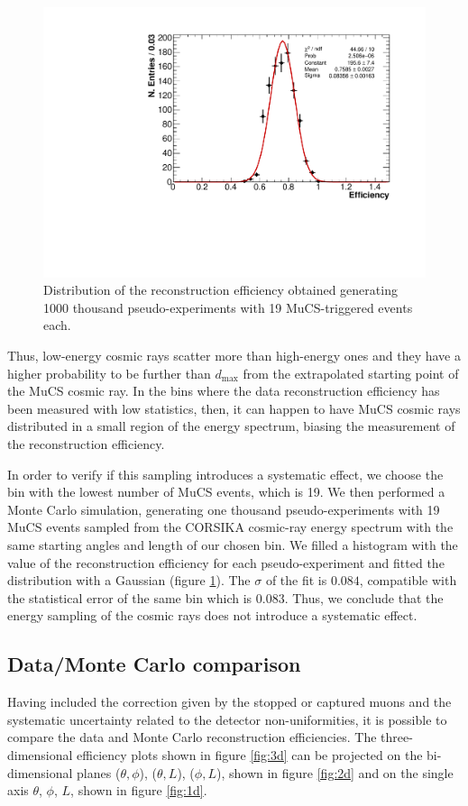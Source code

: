 \documentclass[a4paper]{scrartcl}
\begin{document}
\begin{figure}[htbp]
  \begin{center}
    \includegraphics[width=0.7\linewidth]{figures/sampling.pdf}
    \caption{Distribution of the reconstruction efficiency obtained generating 1000 thousand pseudo-experiments with 19 MuCS-triggered events each.} \label{fig:sampling}
  \end{center}
\end{figure}

Thus, low-energy cosmic rays scatter more than high-energy ones and they have a higher probability to be further than $d_{\mathrm{max}}$ from the extrapolated starting point of the MuCS cosmic ray. In the bins where the data reconstruction efficiency has been measured with low statistics, then, it can happen to have MuCS cosmic rays distributed in a small region of the energy spectrum, biasing the measurement of the reconstruction efficiency.

In order to verify if this sampling introduces a systematic effect, we choose the bin with the lowest number of MuCS events, which is 19. We then performed a Monte Carlo simulation, generating one thousand pseudo-experiments with 19 MuCS events sampled from the CORSIKA cosmic-ray energy spectrum with the same starting angles and length of our chosen bin. We filled a histogram with the value of the reconstruction efficiency for each pseudo-experiment and fitted the distribution with a Gaussian (figure \ref{fig:sampling}). The $\sigma$ of the fit is $0.084$, compatible with the statistical error of the same bin which is $0.083$. Thus, we conclude that the energy sampling of the cosmic rays does not introduce a systematic effect.

\subsection{Data/Monte Carlo comparison}
Having included the correction given by the stopped or captured muons and the systematic uncertainty related to the detector non-uniformities, it is possible to compare the data and Monte Carlo reconstruction efficiencies. The three-dimensional efficiency plots shown in figure \ref{fig:3d} can be projected on the bi-dimensional planes ($\theta,\phi$), ($\theta,L$), ($\phi,L$), shown in figure \ref{fig:2d} and on the single axis $\theta$, $\phi$, $L$, shown in figure \ref{fig:1d}.
\end{document}
